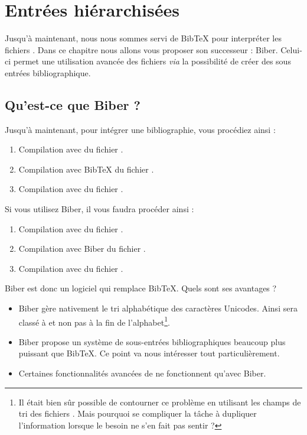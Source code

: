\chapter{Entrées hiérarchisées}\label{biber}

\begin{intro}
Jusqu'à maintenant, nous nous sommes servi de BibTeX pour interpréter les fichiers . Dans ce chapitre nous allons vous proposer son successeur : Biber. Celui-ci  permet une utilisation avancée des fichiers  \emph{via} la possibilité de créer des sous entrées bibliographique.
\end{intro}

\section{Qu'est-ce que Biber ?}

Jusqu'à maintenant, pour intégrer une bibliographie, vous procédiez ainsi :
\begin{enumerate}
\item Compilation avec \XeLaTeX du fichier .
\item Compilation avec BibTeX du fichier .
\item Compilation avec \XeLaTeX du fichier .
\end{enumerate}

Si vous utilisez Biber, il vous faudra procéder ainsi :

\begin{enumerate}
\item Compilation avec \XeLaTeX du fichier .
\item Compilation avec Biber du fichier .
\item Compilation avec \XeLaTeX du fichier .
\end{enumerate}

Biber est donc un logiciel qui remplace BibTeX. Quels sont ses avantages ?

\begin{itemize}
\item Biber gère nativement le tri alphabétique des caractères Unicodes. Ainsi  sera classé à  et non pas à la fin de l'alphabet\footnote{Il était bien sûr possible de contourner ce problème en utilisant les champs de tri des fichiers . Mais pourquoi se compliquer la tâche à dupliquer l'information lorsque le besoin ne s'en fait pas sentir ?}.
\item Biber propose un système de sous-entrées bibliographiques beaucoup plus puissant que BibTeX. Ce  point  va nous intéresser tout particulièrement.
\item Certaines fonctionnalités avancées de  ne fonctionnent qu'avec Biber.
\end{itemize}

